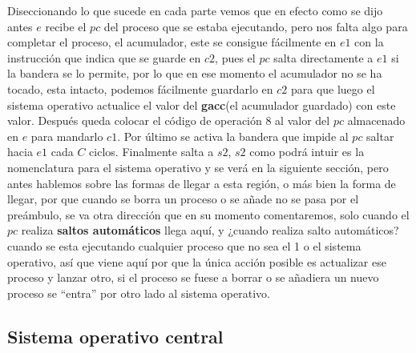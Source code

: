 \documentclass[12pt]{article}
\begin{document}
	Diseccionando lo que sucede
	en cada parte vemos que en efecto como se dijo antes $e$ recibe el $pc$ del proceso que se estaba ejecutando, pero
	nos falta algo para completar el proceso, el acumulador, este se consigue fácilmente en $e1$ con la instrucción que
	indica que se guarde en $c2$, pues el $pc$ salta directamente a $e1$ si la bandera se lo permite, por lo que en ese
	momento el acumulador no se ha tocado, esta intacto, podemos fácilmente guardarlo en $c2$ para que luego el sistema
	operativo actualice el valor del \textbf{gacc}(el acumulador guardado) con este valor. Después queda colocar el código
	de operación $8$ al valor del $pc$ almacenado en $e$ para mandarlo $c1$. Por último se activa la bandera que impide al 
	$pc$ saltar hacia $e1$ cada $C$ ciclos. Finalmente salta a $s2$, $s2$ como podrá intuir es la nomenclatura para el sistema
	operativo y se verá en la siguiente sección, pero antes hablemos sobre las formas de llegar a esta región, o más 
	bien la forma de llegar, por que cuando se borra un proceso o se añade no se pasa por el preámbulo, se va otra
	dirección que en su momento comentaremos, solo cuando el $pc$ realiza \textbf{saltos automáticos} llega aquí, y 
	¿cuando realiza salto automáticos? cuando se esta ejecutando cualquier proceso que no sea el 1 o el sistema operativo,
	así que viene aquí por que la única acción posible es actualizar ese proceso y lanzar otro, si el proceso se fuese a borrar
	o se añadiera un nuevo proceso se ``entra'' por otro lado al sistema operativo.
	
	
	\subsection{Sistema operativo central}
	
\end{document}

